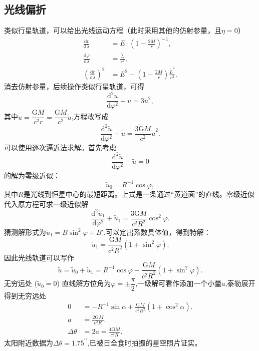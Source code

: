 \documentclass[11pt, a4paper, oneside, onecolumn]{ctexart}
\numberwithin{equation}{subsection}
\begin{document}
\subsection{光线偏折}
类似行星轨道，可以给出光线运动方程（此时采用其他的仿射参量，且$\eta=0$）
\begin{align}
\frac{\mathrm{d}t}{\mathrm{d}\lambda}&=E\cdot\left(1-\frac{2M}{r}\right)^{-1},\\
\frac{\mathrm{d}\varphi}{\mathrm{d}\lambda}&=\frac{\widetilde{L}}{r^{2}},\\
\left(\frac{\mathrm{d}r}{\mathrm{d}\lambda}\right)^{2}&=E^{2}-\left(1-\frac{2M}{r}\right)\frac{\widetilde{L}^{2}}{r^{2}}.
\end{align}
消去仿射参量，后续操作类似行星轨道，可得
\begin{equation}
\frac{\mathrm{d}^{2}u}{\mathrm{d}\varphi^{2}}+u=3u^{2},
\end{equation}
其中$u=\dfrac{\mathrm{G}M}{c^{2}r}=\dfrac{\mathrm{G}M}{c^{2}}\widetilde{u}$,方程改写成
\begin{equation}
\frac{\mathrm{d}^{2}\widetilde{u}}{\mathrm{d}\varphi^{2}}+\widetilde{u}=\frac{3\mathrm{G}M}{c^{2}}\widetilde{u}^{2}.
\end{equation}
可以使用逐次逼近法求解。首先考虑
\begin{equation}
\frac{\mathrm{d}^{2}\widetilde{u}}{\mathrm{d}\varphi^{2}}+\widetilde{u}=0
\end{equation}
的解为零级近似：
\begin{equation}
\widetilde{u}_{0}=R^{-1}\cos\varphi,
\end{equation}
其中$R$是光线到恒星中心的最短距离。上式是一条通过“黄道面”的直线。零级近似代入原方程可求一级近似解
\begin{equation}
\frac{\mathrm{d}^{2}\widetilde{u}_{1}}{\mathrm{d}\varphi^{2}}+\widetilde{u}_{1}=\frac{3\mathrm{G}M}{c^{2}R^{2}}\cos^{2}\varphi.
\end{equation}
猜测解形式为$\widetilde{u}_{1}=B\sin^{2}\varphi+B'$,可以定出系数具体值，得到特解：
\begin{equation}
\widetilde{u}_{1}=\frac{\mathrm{G}M}{c^{2}R^{2}}\left(1+\sin^{2}\varphi\right).
\end{equation}
因此光线轨道可以写作
\begin{equation}
\widetilde{u}=\widetilde{u}_{0}+\widetilde{u}_{1}=R^{-1}\cos\varphi+\frac{\mathrm{G}M}{c^{2}R^{2}}\left(1+\sin^{2}\varphi\right).
\end{equation}
无穷远处 ($\widetilde{u}_{0}=0$) 直线解方位角为$\varphi=\pm\dfrac{\pi}{2}$,一级解可看作添加一个小量$a$,泰勒展开得到无穷远处
\begin{align}
0&=-R^{-1}\sin\alpha+\frac{\mathrm{G}M}{c^{2}R^{2}}\left(1+\cos^{2}\alpha\right).\\
a&=\frac{2\mathrm{G}M}{c^{2}R}.\\
\Delta{}\theta&=2a=\frac{4\mathrm{G}M}{c^{2}R}.
\end{align}
太阳附近数据为$\Delta{}\theta=1.75^{\prime\prime}$,已被日全食时拍摄的星空照片证实。

\printbibliography
\end{document}
